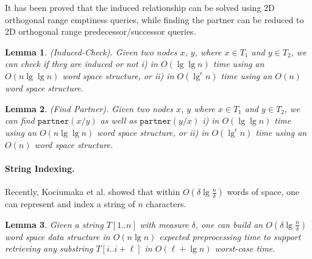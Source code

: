 \documentclass[smallabstract,smallcaptions]{dccpaper}
\newtheorem{lemma}{Lemma}
\def\idtt#1{\ensuremath{\mathtt{#1}}}
\def\occ{\idtt{occ}}
\def\partner{\idtt{partner}}
\begin{document}
	It has been proved that the induced relationship can be solved using 2D orthogonal range emptiness queries, while finding the partner can be reduced to 2D orthogonal range predecessor/successor queries.
	
	
	\begin{lemma}\cite{abedin2018heaviest}
		(Induced-Check). \label{lem:induced-check}
		Given two nodes $x$, $y$, where $x\in T_{1}$ and $y \in T_{2}$, we can check if they are induced or not i) in $O(\lg \lg n)$ time using an $O(n\lg \lg n)$ word space structure, or ii) in $O(\lg^{\epsilon} n)$ time using an $O(n)$ word space structure.
	\end{lemma}
	
	\begin{lemma}\cite{abedin2018heaviest}
		\label{lemma:partner_finding}
		(Find Partner). Given two nodes $x$, $y$ where $x\in T_{1}$ and $y\in T_{2}$, we can find $\partner(x/y)$ as well as $\partner(y/x)$ i) in $O(\lg \lg n)$ time using an $O(n\lg \lg n)$ word space structure, or ii) in $O(\lg^{\epsilon} n)$ time using an $O(n)$ word space structure.
	\end{lemma}
	
	\paragraph{String Indexing.} Recently, Kociumaka et al. \cite{kociumaka2021towards} showed that within $O(\delta \lg \frac{n}{\delta})$  words of space, one can represent and index a string of $n$ characters.
	\begin{lemma}\cite{kociumaka2021towards}
		\label{lemma: self-index}
		Given a string $T[1..n]$ with measure $\delta$, one can build an $O(\delta \lg \frac{n}{\delta})$ word space data structure in $O(n\lg n)$ expected preprocessing time to support retrieving any substring $T[i..i+\ell]$ in $O(\ell+\lg n)$ worst-case time. %
	\end{lemma}
	
\end{document}
